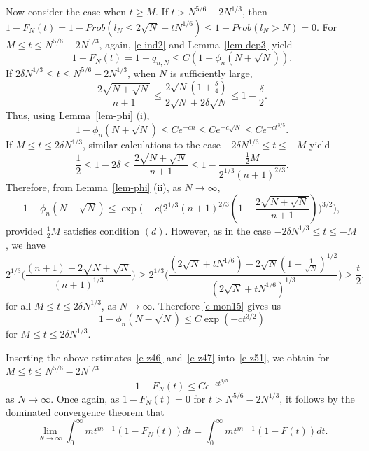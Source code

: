 \documentclass{amsart}
\theoremstyle{definition}
\theoremstyle{remark}
\numberwithin{equation}{section}
\begin{document}
Now consider the case when $t\geq M$.
If $t> N^{5/6}-2N^{1/3}$, then $1-F_N(t)=
1-Prob (l_N\le 2\sqrt{N}+tN^{1/6}) \le 1-Prob(l_N> N)=0$.
For $M\le t\le N^{5/6}-2N^{1/3}$,
again, \eqref{e-ind2} and Lemma~\ref{lem-dep3} yield
\begin{equation}\label{e-z51}
   1-F_N(t)=1-q_{n,N}\le C(1-\phi_n(N+\sqrt{N})).
\end{equation}
If $2\delta N^{1/3}\le t\le N^{5/6}-2N^{1/3}$, when $N$ is sufficiently large,
\begin{equation*}
   \frac{2\sqrt{N+\sqrt{N}}}{n+1} \le
\frac{2\sqrt{N}(1+\frac{\delta}4)}{2\sqrt{N}+2\delta\sqrt{N}}
\le 1-\frac{\delta}2.
\end{equation*}
Thus, using Lemma~\ref{lem-phi} (i),
\begin{equation}\label{e-z46}
   1-\phi_n(N+\sqrt{N})\le Ce^{-cn}\le Ce^{-c\sqrt{N}}\le Ce^{-ct^{3/5}}.
\end{equation}
If $M\le t\le 2\delta N^{1/3}$, similar calculations to the case
$-2\delta N^{1/3}\le t\le -M$ yield
\begin{equation*}
   \frac12\le 1-2\delta \le \frac{2\sqrt{N+\sqrt{N}}}{n+1} \le
1-\frac{\frac12M}{2^{1/3}{(n+1)}^{2/3}}.
\end{equation*}
Therefore, from Lemma~\ref{lem-phi} (ii), as $N\to\infty$, 
\begin{equation}\label{e-mon15}
   1-\phi_n(N-\sqrt{N})\le
\exp\biggl(-c\bigl(2^{1/3}(n+1)^{2/3}
(1-\frac{2\sqrt{N+\sqrt{N}}}{n+1})\bigr)^{3/2} \biggr), 
\end{equation}
provided $\frac12 M$ satisfies condition $(d)$.
However, as in the case $-2\delta N^{1/3}\le t\le -M$, we have
\begin{equation*}
    2^{1/3}\biggl(\frac{(n+1)-2\sqrt{N+\sqrt{N}}}{(n+1)^{1/3}}\biggr)
\geq 2^{1/3}\biggl(
\frac{(2\sqrt{N}+tN^{1/6})-2\sqrt{N}(1+\frac1{\sqrt{N}})^{1/2}}
{(2\sqrt{N}+tN^{1/6})^{1/3}}\biggr)
\geq \frac{t}2.
\end{equation*}
for all $M\le t\le 2\delta N^{1/3}$, as $N\to\infty$.
Therefore \eqref{e-mon15} gives us
\begin{equation}\label{e-z47}
   1-\phi_n(N-\sqrt{N})\le C\exp(-ct^{3/2})
\end{equation}
for $M\le t\le 2\delta N^{1/3}$.

Inserting the above estimates~\eqref{e-z46} and~\eqref{e-z47} 
into~\eqref{e-z51}, we obtain for $M\le t\le N^{5/6}-2N^{1/3}$ 
\begin{equation}\label{e-z48}
   1-F_N(t)\le Ce^{-ct^{3/5}}
\end{equation}
as $N\to\infty$.
Once again, as $1-F_N(t)=0$ for $t>N^{5/6}-2N^{1/3}$, it follows by 
the dominated convergence theorem that 
\begin{equation}
   \lim_{N\to\infty} \int_{0}^{\infty} mt^{m-1} (1-F_N(t)) dt
=\int_{0}^{\infty} mt^{m-1} (1-F(t)) dt.
\end{equation}
\end{document}

